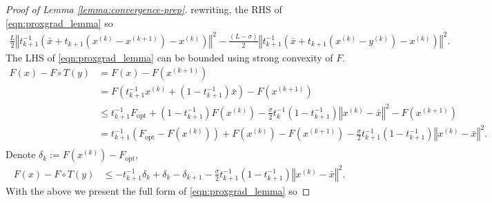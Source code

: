 \begin{proof}[Proof of Lemma \ref*{lemma:convergence-prep}]
        rewriting, the RHS of \hyperref[eqn:proxgrad_lemma]{\ref*{eqn:proxgrad_lemma}} so
        \begin{align*}
            \frac{L}{2} \left\Vert
            t^{-1}_{k + 1}\left(
             \bar x + t_{k + 1} \left(
                 x^{(k)} - x^{(k + 1)}
             \right) - x^{(k)}
             \right)
            \right\Vert^2 - 
            \frac{(L - \sigma)}{2}
            \left\Vert
                t^{-1}_{k + 1}\left(
                    \bar x + t_{k + 1} \left(
                        x^{(k)} - y^{(k)}
                    \right) - x^{(k)}
                \right)
            \right\Vert^2. 
        \end{align*}
        The LHS of \hyperref[eqn:proxgrad_lemma]{\ref*{eqn:proxgrad_lemma}} can be bounded using strong convexity of $F$.
        \begin{align*}
            F(x) - F\circ T(y)
            &= F(x) - F\left(
                x^{(k + 1)}
            \right) 
            \\
            &= F\left(t_{k + 1}^{-1}x^{(k)} + (1 - t^{-1}_{k + 1})\bar x\right) - 
            F\left(x^{(k + 1)}\right)
            \\
            &\le 
            t_{k + 1}^{-1}F_{\text{opt}}
            + 
            (1 - t_{k + 1}^{-1})F\left(x^{(k)}\right)
            - 
            \frac{\sigma}{2}t^{-1}_k\left(1 - t^{-1}_{k + 1}\right)
            \left\Vert 
                x^{(k)} - \bar x
            \right\Vert^2 
            - F\left(x^{(k + 1)}\right)
            \\
            &= 
            t_{k + 1}^{-1} \left(
                F_{\text{opt}} - F\left(x^{(k)}\right)
            \right) + F\left(x^{(k)}\right) - F\left(x^{(k + 1)} \right)
            -
            \frac{\sigma}{2}t^{-1}_{k + 1}\left(1 - t^{-1}_{k + 1}\right)
            \left\Vert 
                x^{(k)} - \bar x
            \right\Vert^2. 
            \\
        \end{align*}
        Denote $\delta_k := F\left(x^{(k)}\right) - F_{\text{opt}}$, 
        \begin{align*}
            F(x) - F\circ T(y) &\le  -t_{k + 1}^{-1}\delta_k + \delta_k  - \delta_{k + 1} 
            -
            \frac{\sigma}{2}t^{-1}_{k + 1}\left(1 - t^{-1}_{k + 1}\right)
            \left\Vert 
                x^{(k)} - \bar x
            \right\Vert^2. 
        \end{align*}
        With the above we present the full form of \hyperref[eqn:proxgrad_lemma]{\ref*{eqn:proxgrad_lemma}} so 

\end{proof}
